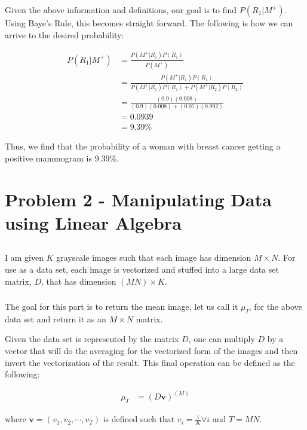 \documentclass{article}[12pt]
\begin{document}
   Given the above information and definitions, our goal is to find $P(R_1 | M^{+})$. Using Baye's Rule, this becomes straight forward. The following is how we can arrive to the desired probability:
   
   \begin{align*}
   P(R_1 | M^{+}) &= \frac{P(M^{+} | R_1) P(R_1) }{P(M^{+})} \\
   &= \frac{P(M^{+} | R_1) P(R_1) }{P(M^{+} | R_1) P(R_1) + P(M^{+} | R_2) P(R_2)} \\
   &= \frac{(0.9) (0.008) }{(0.9) (0.008) + (0.07) (0.992)} \\
   &= 0.0939 \\
   &= 9.39\%
   \end{align*}
   
   Thus, we find that the probability of a woman with breast cancer getting a positive mammogram is 9.39\%.

	\newpage
	\section{Problem 2 - Manipulating Data using Linear Algebra}
	\subsection{}
	I am given $K$ grayscale images such that each image has dimension $M \times N$. For use as a data set, each image is vectorized and stuffed into a large data set matrix, $D$, that has dimension $(MN) \times K$.
	
	\subsubsection{}
	The goal for this part is to return the mean image, let us call it $\mu_I$, for the above data set and return it as an $M \times N$ matrix. 
	
	Given the data set is represented by the matrix $D$, one can multiply $D$ by a vector that will do the averaging for the vectorized form of the images and then invert the vectorization of the result. This final operation can be defined as the following:
	
	\begin{align*}
	\mu_I &= (D \boldsymbol{v} )^{(M)}
	\end{align*}
	
	where $\boldsymbol{v} = (v_1, v_2, \cdots, v_{T})$ is defined such that $v_i = \frac{1}{K} \forall i$ and $T = MN$.
	
\end{document}
